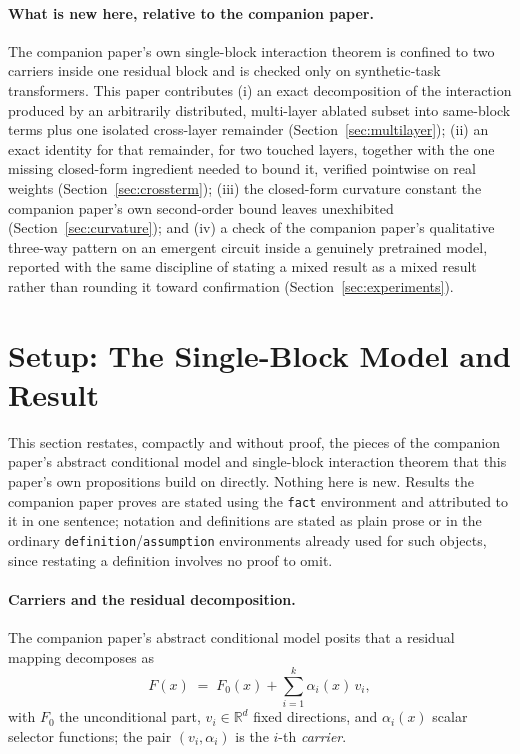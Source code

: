 \documentclass[11pt,a4paper]{article}
\begin{document}
\paragraph{What is new here, relative to the companion paper.} The companion
paper's own single-block interaction theorem is confined to two carriers
inside one residual block and is checked only on synthetic-task
transformers. This paper contributes (i) an exact decomposition of the
interaction produced by an arbitrarily distributed, multi-layer ablated
subset into same-block terms plus one isolated cross-layer remainder
(Section~\ref{sec:multilayer}); (ii) an exact identity for that remainder,
for two touched layers, together with the one missing closed-form ingredient
needed to bound it, verified pointwise on real weights
(Section~\ref{sec:crossterm}); (iii) the closed-form curvature constant the
companion paper's own second-order bound leaves unexhibited
(Section~\ref{sec:curvature}); and (iv) a check of the companion paper's
qualitative three-way pattern on an emergent circuit inside a genuinely
pretrained model, reported with the same discipline of stating a mixed
result as a mixed result rather than rounding it toward confirmation
(Section~\ref{sec:experiments}).

\section{Setup: The Single-Block Model and Result}
\label{sec:setup}

This section restates, compactly and without proof, the pieces of the
companion paper's abstract conditional model and single-block interaction
theorem that this paper's own propositions build on directly. Nothing here is
new. Results the companion paper proves are stated using the \texttt{fact}
environment and attributed to it in one sentence; notation and definitions
are stated as plain prose or in the ordinary \texttt{definition}/\texttt{assumption}
environments already used for such objects, since restating a definition
involves no proof to omit.

\paragraph{Carriers and the residual decomposition.} The companion paper's
abstract conditional model posits that a residual mapping decomposes as
\[
F(x) \;=\; F_0(x) + \sum_{i=1}^{k}\alpha_i(x)\,v_i,
\]
with $F_0$ the unconditional part, $v_i\in\mathbb R^d$ fixed directions, and
$\alpha_i(x)$ scalar selector functions; the pair $(v_i,\alpha_i)$ is the
$i$-th \emph{carrier}.
\end{document}
